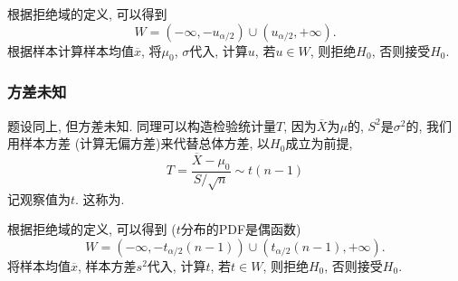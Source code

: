 根据拒绝域的定义, 可以得到
\begin{equation}
    W = (-\infty, -u_{\alpha/2}) \cup (u_{\alpha/2}, +\infty).
\end{equation}
根据样本计算样本均值$\overline{x}$, 将$\mu_0$, $\sigma$代入, 计算$u$, 若$u\in W$, 则拒绝$H_0$, 否则接受$H_0$.
\subsubsection{方差未知}
题设同上, 但方差未知. 同理可以构造检验统计量$T$, 因为$\overline{X}$为$\mu$的, $S^2$是$\sigma^2$的,
我们用样本方差 (计算无偏方差)来代替总体方差, 以$H_0$成立为前提,
\begin{equation}
    T = \dfrac{\overline{X} - \mu_0}{S / \sqrt{n}}\sim t(n-1)
\end{equation}
记观察值为$t$. 这称为.

根据拒绝域的定义, 可以得到 ($t$分布的PDF是偶函数)
\begin{equation}
    W = (-\infty, -t_{\alpha/2}(n-1)) \cup (t_{\alpha/2}(n-1), +\infty).
\end{equation}
将样本均值$\overline{x}$, 样本方差$s^2$代入, 计算$t$, 若$t\in W$, 则拒绝$H_0$, 否则接受$H_0$.
